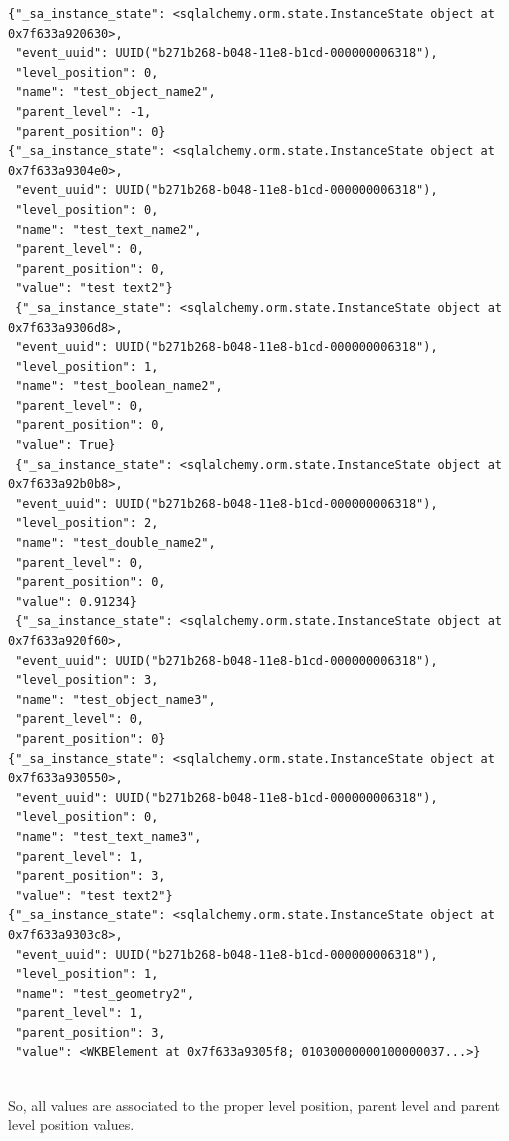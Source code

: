 \begin{lstlisting}[style=python, caption={JSON output after query the gsdm for the specific event previously shown.}]
{"_sa_instance_state": <sqlalchemy.orm.state.InstanceState object at 0x7f633a920630>,
 "event_uuid": UUID("b271b268-b048-11e8-b1cd-000000006318"),
 "level_position": 0,
 "name": "test_object_name2",
 "parent_level": -1,
 "parent_position": 0}
{"_sa_instance_state": <sqlalchemy.orm.state.InstanceState object at 0x7f633a9304e0>,
 "event_uuid": UUID("b271b268-b048-11e8-b1cd-000000006318"),
 "level_position": 0,
 "name": "test_text_name2",
 "parent_level": 0,
 "parent_position": 0,
 "value": "test text2"}
 {"_sa_instance_state": <sqlalchemy.orm.state.InstanceState object at 0x7f633a9306d8>,
 "event_uuid": UUID("b271b268-b048-11e8-b1cd-000000006318"),
 "level_position": 1,
 "name": "test_boolean_name2",
 "parent_level": 0,
 "parent_position": 0,
 "value": True}
 {"_sa_instance_state": <sqlalchemy.orm.state.InstanceState object at 0x7f633a92b0b8>,
 "event_uuid": UUID("b271b268-b048-11e8-b1cd-000000006318"),
 "level_position": 2,
 "name": "test_double_name2",
 "parent_level": 0,
 "parent_position": 0,
 "value": 0.91234}
 {"_sa_instance_state": <sqlalchemy.orm.state.InstanceState object at 0x7f633a920f60>,
 "event_uuid": UUID("b271b268-b048-11e8-b1cd-000000006318"),
 "level_position": 3,
 "name": "test_object_name3",
 "parent_level": 0,
 "parent_position": 0}
{"_sa_instance_state": <sqlalchemy.orm.state.InstanceState object at 0x7f633a930550>,
 "event_uuid": UUID("b271b268-b048-11e8-b1cd-000000006318"),
 "level_position": 0,
 "name": "test_text_name3",
 "parent_level": 1,
 "parent_position": 3,
 "value": "test text2"}
{"_sa_instance_state": <sqlalchemy.orm.state.InstanceState object at 0x7f633a9303c8>,
 "event_uuid": UUID("b271b268-b048-11e8-b1cd-000000006318"),
 "level_position": 1,
 "name": "test_geometry2",
 "parent_level": 1,
 "parent_position": 3,
 "value": <WKBElement at 0x7f633a9305f8; 01030000000100000037...>}
 
\end{lstlisting}

So, all values are associated to the proper level position, parent level and parent level position values.
